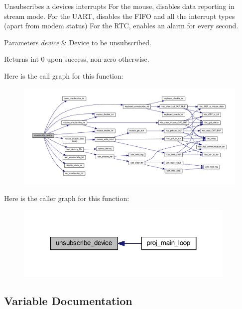 Unsubscribes a device\textquotesingle{}s interrupts For the mouse, disables data reporting in stream mode. For the U\+A\+RT, disables the F\+I\+FO and all the interrupt types (apart from modem status) For the R\+TC, enables an alarm for every second. 


\begin{DoxyParams}{Parameters}
{\em device} & Device to be unsubscribed. \\
\hline
\end{DoxyParams}
\begin{DoxyReturn}{Returns}
int 0 upon success, non-\/zero otherwise. 
\end{DoxyReturn}
Here is the call graph for this function\+:
\nopagebreak
\begin{figure}[H]
\begin{center}
\leavevmode
\includegraphics[width=350pt]{group__interrupts_gac34cc7680c64171b47100c01bb019ab4_cgraph}
\end{center}
\end{figure}
Here is the caller graph for this function\+:\nopagebreak
\begin{figure}[H]
\begin{center}
\leavevmode
\includegraphics[width=299pt]{group__interrupts_gac34cc7680c64171b47100c01bb019ab4_icgraph}
\end{center}
\end{figure}


\subsection{Variable Documentation}
\mbox{\label{group__interrupts_ga9bcd8935448dbeb1714a51b8af36c929}} 
